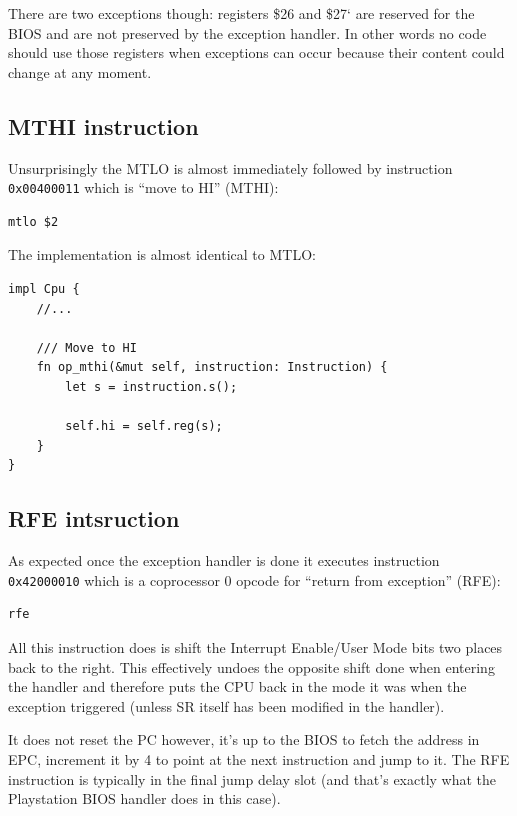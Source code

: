 \documentclass[a4paper]{article}
\newcommand{\code}[1] {\texttt{#1}}
\begin{document}
There are two exceptions though: registers \$26 and \$27` are reserved
for the BIOS and are not preserved by the exception handler. In other
words no code should use those registers when exceptions can occur
because their content could change at any moment.

\subsection{MTHI instruction}

Unsurprisingly the MTLO is almost immediately followed by instruction
\code{0x00400011} which is ``move to HI'' (MTHI):

\begin{lstlisting}[language=assembly]
mtlo $2
\end{lstlisting}

The implementation is almost identical to MTLO:

\begin{lstlisting}
impl Cpu {
    //...

    /// Move to HI
    fn op_mthi(&mut self, instruction: Instruction) {
        let s = instruction.s();

        self.hi = self.reg(s);
    }
}
\end{lstlisting}

\subsection{RFE intsruction}

As expected once the exception handler is done it executes instruction
\code{0x42000010} which is a coprocessor 0 opcode for ``return from
exception'' (RFE):

\begin{lstlisting}[language=assembly]
rfe
\end{lstlisting}

All this instruction does is shift the Interrupt Enable/User Mode bits
two places back to the right. This effectively undoes the opposite
shift done when entering the handler and therefore puts the CPU back
in the mode it was when the exception triggered (unless SR itself has
been modified in the handler).

It does not reset the PC however, it's up to the BIOS to fetch the
address in EPC, increment it by 4 to point at the next instruction and
jump to it. The RFE instruction is typically in the final jump delay
slot (and that's exactly what the Playstation BIOS handler does in
this case).
\end{document}
